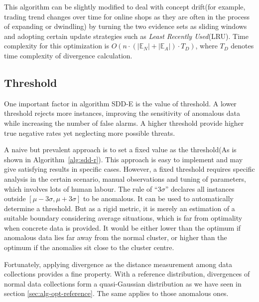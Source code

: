 \documentclass[10pt,conference,letterpaper]{article}
\begin{document}
			This algorithm can be slightly modified to deal with concept drift(for example, trading trend changes over time for online shops as they are often in the process of expanding or dwindling) by turning the two evidence sets as sliding windows and adopting certain update strategies such as \textit{Least Recently Used}(LRU). Time complexity for this optimization is $O(n\cdot(|\mathbb{E}_N|+|\mathbb{E}_A|)\cdot T_D)$, where $T_D$ denotes time complexity of divergence calculation.
	
		\subsection{Threshold}\label{sec:alg-threshold}
			One important factor in algorithm SDD-E is the value of threshold. A lower threshold rejects more instances, improving the sensitivity of anomalous data while increasing the number of false alarms. A higher threshold provide higher true negative rates yet neglecting more possible threats.
			
			A naive but prevalent approach is to set a fixed value as the threshold(As is shown in Algorithm~\ref{alg:sdd-r}). This approach is easy to implement and may give satisfying results in specific cases. However, a fixed threshold requires specific analysis in the certain scenario, manual observations and tuning of parameters, which involves lots of human labour. The rule of ``$3 \sigma$'' declares all instances outside $[\mu - 3\sigma, \mu + 3\sigma]$ to be anomalous. It can be used to automatically determine a threshold. But as a rigid metric, it is merely an estimation of a suitable boundary considering average situations, which is far from optimality when concrete data is provided. It would be either lower than the optimum if anomalous data lies far away from the normal cluster, or higher than the optimum if the anomalies sit close to the cluster centre.
	
			Fortunately, applying divergence as the distance measurement among data collections provides a fine property. With a reference distribution, divergences of normal data collections form a quasi-Gaussian distribution as we have seen in section \ref{sec:alg-opt-reference}. The same applies to those anomalous ones.
	
\end{document}
